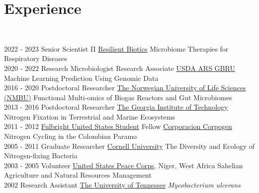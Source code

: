 \documentclass[letterpaper]{twentysecondcv3} %
\begin{document}
\section{Experience}\\
\begin{twenty} %
\twentyitem
    	{2022 -}
		{2023}
        {Senior Scientist II}
        {\href{https://resilientbiotics.com/}{Resilient Biotics}}
        {Microbiome Therapies for Respiratory Diseases}\\

\twentyitem
    	{2020 -}
		{2022}
        {Research Microbiologist Research Associate}
        {\href{https://www.ars.usda.gov/southeast-area/stoneville-ms/genomics-and-bioinformatics-research/}{USDA ARS GBRU}}
        {Machine Learning Prediction Using Genomic Data}\\

    \twentyitem
    	{2016 -}
		{2020}
        {Postdoctoral Researcher}
        {\href{https://www.nmbu.no/}{The Norwegian University of Life Sciences (NMBU)}}
        {Functional Multi-omics of Biogas Reactors and Gut Microbiomes}\\

    \twentyitem
   	{2013 -}
		{2016}
        {Postdoctoral Researcher}
        {\href{https://www.gatech.edu/}{The Georgia Institute of Technology}}
        {Nitrogen Fixation in Terrestrial and Marine Ecosystems}\\

    \twentyitem
   	{2011 -}
		{2012}
        {\href{https://us.fulbrightonline.org/}{Fulbright United States Student} Fellow}
        {\href{https://www.corpogen.org/}{Corporacion Corpogen}}
        {Nitrogen Cycling in the Colombian Paramo}\\

    \twentyitem
   	{2005 -}
		{2011}
        {Graduate Researcher}
        {\href{https://www.cornell.edu/}{Cornell University}}
        {The Diversity and Ecology of Nitrogen-fixing Bacteria}\\

    \twentyitem
   	{2003 -}
		{2005}
        {Volunteer}
        {\href{https://www.peacecorps.gov/}{United States Peace Corps}, Niger, West Africa}
        {Sahelian Agriculture and Natural Resources Management}\\

    \twentyitem
   	{2002}
		{}
        {Research Assistant}
        {\href{https://www.utk.edu/}{The University of Tennessee}}
        {\textit{Mycobacterium ulcerans}}\\


\end{twenty}
\end{document}
